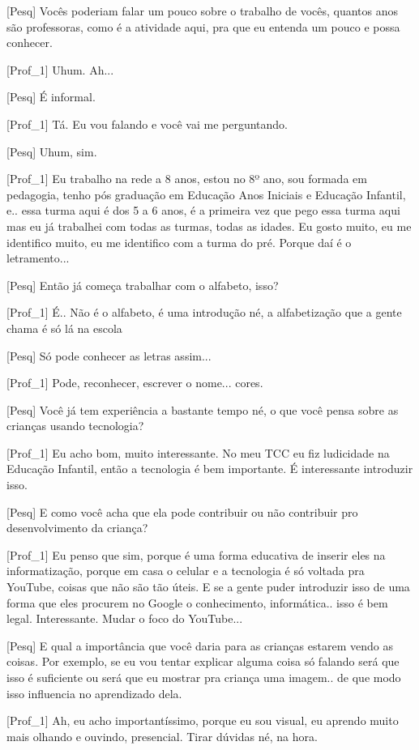 [Pesq] Vocês poderiam falar um pouco sobre o trabalho de vocês, quantos anos são professoras, como é a atividade aqui, pra que eu entenda um pouco e possa conhecer.

[Prof\_1] Uhum. Ah... 
    
[Pesq] É informal.

[Prof\_1] Tá. Eu vou falando e você vai me perguntando. 
    
[Pesq] Uhum, sim.

[Prof\_1]  Eu trabalho na rede a 8 anos, estou no 8º ano, sou formada em pedagogia, tenho pós graduação em Educação Anos Iniciais e Educação Infantil, e.. essa turma aqui é dos 5 a 6 anos, é a primeira vez que pego essa turma aqui mas eu já trabalhei com todas as turmas, todas as idades. Eu gosto muito, eu me identifico muito, eu me identifico com a turma do pré. Porque daí é o letramento...
    
[Pesq] Então já começa trabalhar com o alfabeto, isso?

[Prof\_1] É.. Não é o alfabeto, é uma introdução né, a alfabetização que a gente chama é só lá na escola
    
[Pesq] Só pode conhecer as letras assim...

[Prof\_1] Pode, reconhecer, escrever o nome... cores.
    
[Pesq] Você já tem experiência a bastante tempo né, o que você pensa sobre as crianças usando tecnologia?

[Prof\_1] Eu acho bom, muito interessante. No meu TCC eu fiz ludicidade na Educação Infantil, então a tecnologia é bem importante. É interessante introduzir isso. 
    
[Pesq] E como você acha que ela pode contribuir ou não contribuir pro desenvolvimento da criança?

[Prof\_1] Eu penso que sim, porque é uma forma educativa de inserir eles na informatização, porque em casa o celular e a tecnologia é só voltada pra YouTube, coisas que não são tão úteis. E se a gente puder introduzir isso de uma forma que eles procurem no Google o conhecimento, informática.. isso é bem legal. Interessante. Mudar o foco do YouTube...
    
[Pesq] E qual a importância que você daria para as crianças estarem vendo as coisas. Por exemplo, se eu vou tentar explicar alguma coisa só falando será que isso é suficiente ou será que eu mostrar pra criança uma imagem.. de que modo isso influencia no aprendizado dela. 

[Prof\_1] Ah, eu acho importantíssimo, porque eu sou visual, eu aprendo muito mais olhando e ouvindo, presencial. Tirar dúvidas né, na hora.
    
